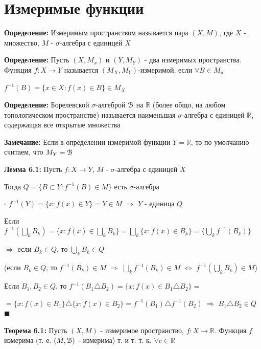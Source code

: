 \documentclass[a4paper]{report}
\begin{document}
\chapter{Измеримые функции}

\noindent\textbf{Определение:} Измеримым пространством называется пара $(X,M)$, где $X$ - множество, $M$ - $\sigma$-алгебра
с единицей $X$
\bigskip

\noindent\textbf{Определение:} Пусть $(X,M_x)$ и $(Y,M_Y)$ - два измеримых пространства. Функция $f\colon X\to Y$ называется
$(M_X,M_Y)$-измеримой, если $\forall B\in M_y$

$f^{-1}(B)=\{x\in X\colon f(x)\in B\}\in M_X$
\bigskip

\noindent\textbf{Определение:} Борелевской $\sigma$-алгеброй $\EuScript B$ на $\mathbb R$ (более общо, на любом
топологическом пространстве) называется наименьшая $\sigma$-алгебра с единицей $\mathbb R$, содержащая все открытые множества
\bigskip

\noindent\textbf{Замечание:} Если в определении измеримой функции $Y=\mathbb R$, то по умолчанию считаем, что $M_Y=\EuScript B$
\bigskip

\noindent\textbf{Лемма 6.1:} Пусть $f\colon X\to Y$, $M$ - $\sigma$-алгебра с единицей $X$

 Тогда $Q=\{B\subset Y\colon f^{-1}(B)\in M\}$ есть $\sigma$-алгебра

\noindent $\square$ $f^{-1}(Y)=\{x\colon f(x)\in Y\}=Y\in M$ $\Rightarrow$ $Y$ - единица $Q$

Если $f^{-1}(\bigsqcup\limits_k B_k)=\{x\colon f(x)\in\bigsqcup\limits_k B_k\}=\bigsqcup\limits_k\{x\colon f(x)\in B_k\}=\{
\bigcup\limits_k f^{-1}(B_k)\}$

$\Rightarrow$ если $B_k\in Q$, то $\bigcup\limits_k B_k\in Q$

(если $B_k\in Q$, то $f^{-1}(B_k)\in M$ $\Rightarrow$ $\bigsqcup\limits_k f^{-1}(B_k)\in M$ $\Leftrightarrow$
$f^{-1}(\bigcup\limits_k B_k)\in M$)

Если $B_1,B_2\in Q$, то $f^{-1}(B_1\triangle B_2)=\{x\colon f(x)\in B_1\triangle B_2\}=$

$=\{x\colon f(x)\in B_1\}\triangle\{x\colon
f(x)\in B_2\}=f^{-1}(B_1)\triangle f^{-1}(B_2)$ $\Rightarrow$ $B_1\triangle B_2\in Q$ $\blacksquare$
\bigskip

\noindent\textbf{Теорема 6.1:} Пусть $(X,M)$ - измеримое пространство, $f\colon X\to\mathbb R$. Функция $f$ измерима
(т. е. $(M,\EuScript B)$ - измерима) т. и т. т. к. $\forall c\in\mathbb R$
\end{document}
